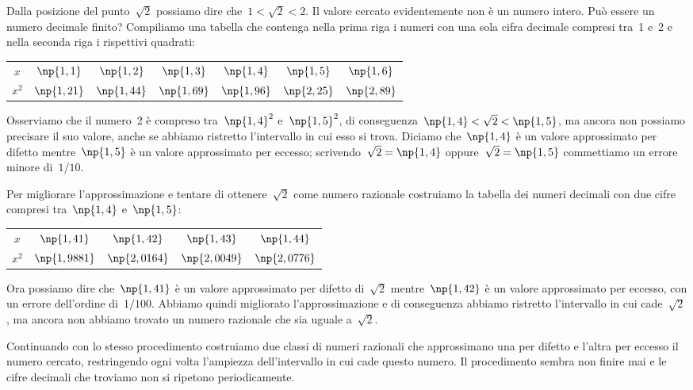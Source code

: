 Dalla posizione del punto~$\sqrt{2}$ possiamo dire che~$1<\sqrt{2}<2$. Il
valore cercato evidentemente non è un numero intero. Può essere un
numero decimale finito? Compiliamo una tabella che contenga nella prima
riga i numeri con una sola cifra decimale compresi tra~1 e~2 e nella
seconda riga i rispettivi quadrati:

\begin{center}
\begin{tabular}{ccccccc}
\toprule
$x$ & $\np{1,1}$ & $\np{1,2}$ & $\np{1,3}$ & $\np{1,4}$ & $\np{1,5}$ & $\np{1,6}$\\
$x^{2}$ & $\np{1,21}$ & $\np{1,44}$ & $\np{1,69}$ & $\np{1,96}$ & $\np{2,25}$ & $\np{2,89}$\\
\bottomrule
\end{tabular}
\end{center}

Osserviamo che il numero~2 è compreso tra~$\np{1,4}^{2}$ e~$\np{1,5}^{2}$,
di conseguenza~$\np{1,4}<\sqrt{2}<\np{1,5}$, ma ancora
non possiamo precisare il suo valore, anche se abbiamo ristretto
l'intervallo in cui esso si trova. Diciamo che~$\np{1,4}$ è un valore approssimato per
difetto mentre~$\np{1,5}$
è un valore approssimato per eccesso; scrivendo~$\sqrt{2}=\np{1,4}$
oppure~$\sqrt{2}=\np{1,5}$ commettiamo un errore minore di~$1/10$.

Per migliorare l'approssimazione e tentare di ottenere~$\sqrt{2}$
come numero razionale costruiamo la tabella dei numeri
decimali con due cifre compresi tra~$\np{1,4}$ e~$\np{1,5}$:

\begin{center}
\begin{tabular}{ccccc}
\toprule
$x$ & $\np{1,41}$ & $\np{1,42}$ & $\np{1,43}$ & $\np{1,44}$\\
$x^{2}$ & $\np{1,9881}$ & $\np{2,0164}$ & $\np{2,0049}$ & $\np{2,0776}$\\
\bottomrule
\end{tabular}
\end{center}

Ora possiamo dire che~$\np{1,41}$ è un valore approssimato per difetto di~$\sqrt{2}$ mentre~$\np{1,42}$ è un valore approssimato
per eccesso, con un errore dell'ordine di~$1/100$. Abbiamo quindi migliorato
l'approssimazione e di conseguenza abbiamo ristretto l'intervallo in cui cade~$\sqrt{2}$, ma ancora non
abbiamo trovato un numero razionale che sia uguale a~$\sqrt{2}$.

Continuando con lo stesso procedimento costruiamo due classi di numeri razionali che approssimano una per difetto e
l'altra per eccesso il numero cercato, restringendo ogni volta l'ampiezza dell'intervallo in cui cade questo numero.
Il procedimento sembra non finire mai e le cifre decimali che troviamo non si ripetono periodicamente.

